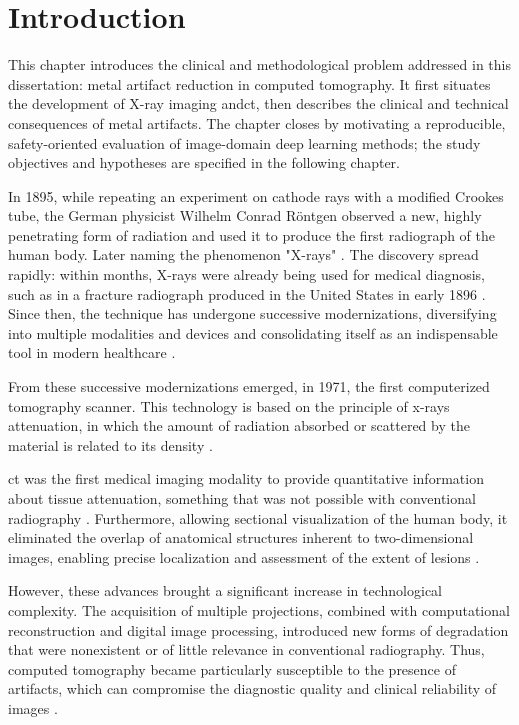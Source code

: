 \chapter{Introduction}
\label{chap:final-introduction}
This chapter introduces the clinical and methodological problem addressed in this dissertation: metal artifact reduction in computed tomography. It first situates the development of X-ray imaging and\acrshort{ct}, then describes the clinical and technical consequences of metal artifacts. The chapter closes by motivating a reproducible, safety-oriented evaluation of image-domain deep learning methods; the study objectives and hypotheses are specified in the following chapter.

In 1895, while repeating an experiment on cathode rays with a modified Crookes tube, the German physicist Wilhelm Conrad Röntgen observed a new, highly penetrating form of radiation and used it to produce the first radiograph of the human body. Later naming the phenomenon "X-rays" \cite{November81895,okunoFisicaRadiacoes2010}. The discovery spread rapidly: within months, X-rays were already being used for medical diagnosis, such as in a fracture radiograph produced in the United States in early 1896 \cite{November81895}. Since then, the technique has undergone successive modernizations, diversifying into multiple modalities and devices and consolidating itself as an indispensable tool in modern healthcare \cite{howellEARLYCLINICALUSE2016, taylorIlluminatingHealthEvolution2023}.

From these successive modernizations emerged, in 1971, the first computerized tomography scanner. This technology is based on the principle of x-rays attenuation, in which the amount of radiation absorbed or scattered by the material is related to its density \cite{valiUnveilingMarvelsComputed2024, noorOverviewComputedTomography2023}.

\acrfull{ct} was the first medical imaging modality to provide quantitative information about tissue attenuation, something that was not possible with conventional radiography \cite{schulzHowCTHappened2021}. Furthermore, allowing sectional visualization of the human body, it eliminated the overlap of anatomical structures inherent to two-dimensional images, enabling precise localization and assessment of the extent of lesions \cite{schulzHowCTHappened2021}. 

However, these advances brought a significant increase in technological complexity. The acquisition of multiple projections, combined with computational reconstruction and digital image processing, introduced new forms of degradation that were nonexistent or of little relevance in conventional radiography. Thus, computed tomography became particularly susceptible to the presence of artifacts, which can compromise the diagnostic quality and clinical reliability of images \cite{schulzHowCTHappened2021}.
 
